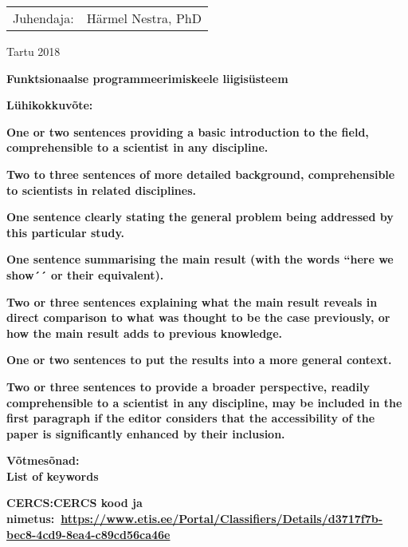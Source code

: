 \documentclass[12pt]{article}
\newcommand\markus[1]{\textcolor{roheline}{\textbf{#1}}}
\begin{document}
  \begin{flushright}
    {
      \setlength{\extrarowheight}{5pt}
      \begin{tabular}{rl} 
        Juhendaja: & Härmel Nestra, PhD
      \end{tabular}}
  \end{flushright}
  \vfill
  \centerline{Tartu 2018}
  \newpage
{
\noindent\textbf{\large Funktsionaalse programmeerimiskeele liigisüsteem}

\vspace*{1ex}

\noindent\textbf{Lühikokkuvõte:} 

\markus{One or two sentences providing a basic introduction to the field, comprehensible to a scientist in
any discipline.}

\markus{Two to three sentences of
more detailed background, comprehensible to scientists in related disciplines.}

\markus{One sentence clearly stating the general problem being addressed by this particular
study.}

\markus{One sentence summarising the main result (with the words ``here we show´´ or their equivalent).}

\markus{Two or three sentences explaining what
the main result reveals in direct
comparison to what was thought to be the case previously, or how the main result adds to previous knowledge.}

\markus{One or two sentences to put the results into a more general context.}

\markus{Two or three sentences to provide a
broader perspective, readily
comprehensible to a scientist in any
discipline, may be included in the first paragraph
if the editor considers that the accessibility of
the paper is significantly enhanced by their inclusion.}

\vspace*{1ex}

\noindent \textbf{Võtmesõnad:}\\
\markus{List of keywords}

\vspace*{1ex}

\noindent\textbf{CERCS:}\markus{CERCS kood ja nimetus:~\url{https://www.etis.ee/Portal/Classifiers/Details/d3717f7b-bec8-4cd9-8ea4-c89cd56ca46e}}

\vspace*{1ex}}
\end{document}
